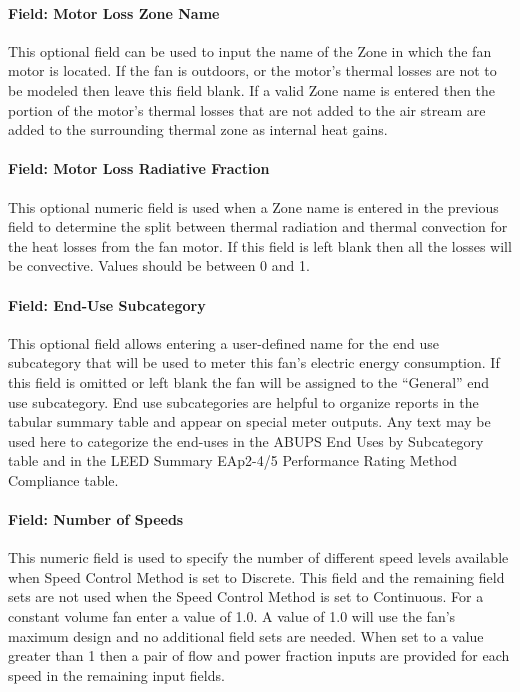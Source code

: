 \paragraph{Field: Motor Loss Zone Name}\label{field-loss-zone-name-fansysmodel}

This optional field can be used to input the name of the Zone in which the fan motor is located.  If the fan is outdoors, or the motor's thermal losses are not to be modeled then leave this field blank.  If a valid Zone name is entered then the portion of the motor's thermal losses that are not added to the air stream are added to the surrounding thermal zone as internal heat gains.

\paragraph{Field: Motor Loss Radiative Fraction}\label{field-loss-rad-frac-fansysmodel}

This optional numeric field is used when a Zone name is entered in the previous field to determine the split between thermal radiation and thermal convection for the heat losses from the fan motor. If this field is left blank then all the losses will be convective.  Values should be between 0 and 1.

\paragraph{Field: End-Use Subcategory}\label{field-end-use-subcat-fansysmodel}

This optional field allows entering a user-defined name for the end use subcategory that will be used to meter this fan's electric energy consumption. If this field is omitted or left blank the fan will be assigned to the ``General'' end use subcategory.  End use subcategories are helpful to organize reports in the tabular summary table and appear on special meter outputs. Any text may be used here to categorize the end-uses in the ABUPS End Uses by Subcategory table and in the LEED Summary EAp2-4/5 Performance Rating Method Compliance table.

\paragraph{Field: Number of Speeds}\label{field-num-speeds-fansysmodel}

This numeric field is used to specify the number of different speed levels available when Speed Control Method is set to Discrete. This field and the remaining field sets are not used when the Speed Control Method is set to Continuous.  For a constant volume fan enter a value of 1.0.  A value of 1.0 will use the fan's maximum design and no additional field sets are needed.  When set to a value greater than 1 then a pair of flow and power fraction inputs are provided for each speed in the remaining input fields.

